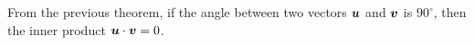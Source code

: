 From the previous theorem, if the angle between two vectors $\boldsymbol u$ and $\boldsymbol v$ is $90^\circ$, then the inner product $\boldsymbol u \cdot \boldsymbol v = 0$.\\

%
%
%


